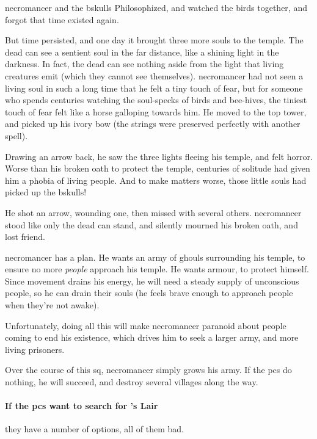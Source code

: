 \begin{exampletext}
  \Gls{necromancer} and the \gls{bskulls} Philosophized, and watched the birds together, and forgot that time existed again.

  But time persisted, and one day it brought three more souls to the temple.
  The dead can see a sentient soul in the far distance, like a shining light in the darkness.
  In fact, the dead can see nothing aside from the light that living creatures emit (which they cannot see themselves).%
  \Gls{necromancer} had not seen a living soul in such a long time that he felt a tiny touch of fear, but for someone who spends centuries watching the soul-specks of birds and bee-hives, the tiniest touch of fear felt like a horse galloping towards him.
  He moved to the top tower, and picked up his ivory bow (the strings were preserved perfectly with another spell).

  Drawing an arrow back, he saw the three lights fleeing his temple, and felt horror.
  Worse than his broken oath to protect the temple, centuries of solitude had given him a phobia of living people.
  And to make matters worse, those little souls had picked up the \gls{bskulls}!

  He shot an arrow, wounding one, then missed with several others.
  \Gls{necromancer} stood like only the dead can stand, and silently mourned his broken oath, and lost friend.

\end{exampletext}


\Gls{necromancer} has a plan.
He wants an army of ghouls surrounding his temple, to ensure no more \emph{people} approach his temple.
He wants armour, to protect himself.
Since movement drains his energy, he will need a steady supply of unconscious people, so he can drain their souls (he feels brave enough to approach people when they're not awake).

Unfortunately, doing all this will make \gls{necromancer} paranoid about people coming to end his existence, which drives him to seek a larger army, and more living prisoners.

Over the course of this \gls{sq}, \gls{necromancer} simply grows his army.
If the \glspl{pc} do nothing, he will succeed, and destroy several \glspl{village} along the way.

\paragraph{If the \glspl{pc} want to search for 's Lair}
\label{huntingNecro}
they have a number of options, all of them bad.

